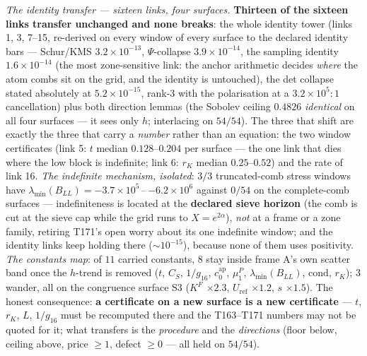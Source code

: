 \documentclass[11pt,a4paper]{article}
\begin{document}
\emph{The identity transfer --- sixteen links, four surfaces.}
\textbf{Thirteen of the sixteen links transfer unchanged and none
breaks}: the whole identity tower (links 1, 3, 7--15, re-derived on
every window of every surface to the declared identity bars ---
Schur/KMS $3.2\times10^{-13}$, $\Psi$-collapse $3.9\times10^{-14}$, the
sampling identity $1.6\times10^{-14}$ (the most zone-sensitive link:
the anchor arithmetic decides \emph{where} the atom combs sit on the
grid, and the identity is untouched), the det collapse stated
absolutely at $5.2\times10^{-15}$, rank-3 with the polarisation at a
$3.2\times10^{5}{:}1$ cancellation) plus both direction lemmas (the
Sobolev ceiling $0.4826$ \emph{identical} on all four surfaces --- it
sees only $h$; interlacing on $54/54$). The three that shift are
exactly the three that carry a \emph{number} rather than an equation:
the two window certificates (link 5: $t$ median $0.128$--$0.204$ per
surface --- the one link that dies where the low block is indefinite;
link 6: $r_K$ median $0.25$--$0.52$) and the rate of link 16.
\emph{The indefinite mechanism, isolated}: $3/3$ truncated-comb stress
windows have $\lambda_{\min}(B_{LL})=-3.7\times10^{5}$\,--\,$-6.2
\times10^{6}$ against $0/54$ on the complete-comb surfaces ---
indefiniteness is located at the \textbf{declared sieve horizon} (the
comb is cut at the sieve cap while the grid runs to $X=e^{2\alpha}$),
\emph{not} at a frame or a zone family, retiring T171's open worry
about its one indefinite window; and the identity links keep holding
there ($\sim10^{-15}$), because none of them uses positivity.
\emph{The constants map}: of $11$ carried constants, $8$ stay inside
frame A's own scatter band once the $h$-trend is removed ($t$, $C_S$,
$1/g_{16}$, $c_0^{\mathrm{ap}}$, $\mu^P_1$, $\lambda_{\min}(B_{LL})$,
$\mathrm{cond}$, $r_K$); $3$ wander, all on the congruence surface S3
($K^F$ $\times2.3$, $U_{\mathrm{ref}}$ $\times1.2$, $s$ $\times1.5$).
The honest consequence: \textbf{a certificate on a new surface is a new
certificate} --- $t$, $r_K$, $L$, $1/g_{16}$ must be recomputed there
and the T163--T171 numbers may not be quoted for it; what transfers is
the \emph{procedure} and the \emph{directions} (floor below, ceiling
above, price $\ge1$, defect $\ge0$ --- all held on $54/54$).
\end{document}
